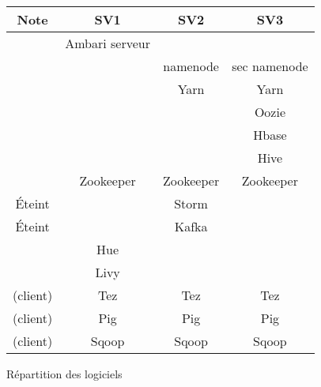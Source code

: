 \begin{figure}[h!]
\centering
    
\begin{tabular}{|c|c|c|c|}
\hline
Note&SV1&SV2&SV3\\ \hline
&Ambari serveur&&\\ \hline
&&namenode&sec namenode\\ \hline
&&Yarn&Yarn\\ \hline
&&&Oozie\\ \hline
&&&Hbase\\ \hline
&&&Hive\\ \hline
&Zookeeper&Zookeeper&Zookeeper\\ \hline
Éteint&&Storm&\\ \hline
Éteint&&Kafka&\\ \hline
&Hue&&\\ \hline
&Livy&&\\ \hline
(client)&Tez&Tez&Tez\\ \hline
(client)&Pig&Pig&Pig\\ \hline
(client)&Sqoop&Sqoop&Sqoop\\ \hline
\end{tabular}

\caption{Répartition des logiciels}
\end{figure}



